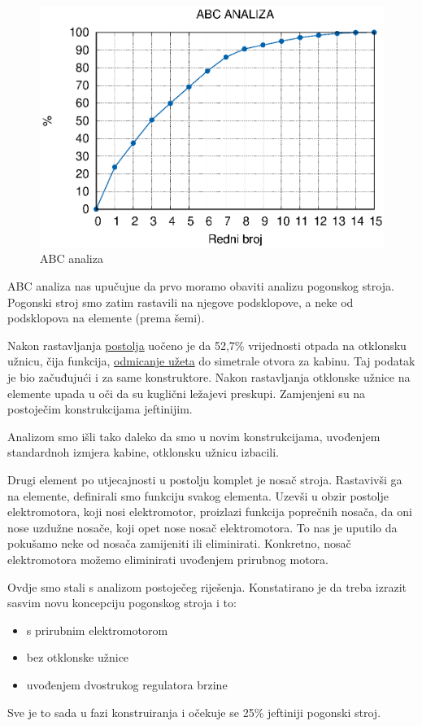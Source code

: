 \documentclass[a4paper,12pt]{article}
\numberwithin{figure}{section}
\begin{document}
\begin{figure}
  \centering
    \includegraphics[width=0.8\paperwidth]{abcAnaliza.eps}
    \caption{ABC analiza}
    \label{analiza}
\end{figure}
\FloatBarrier

ABC analiza nas upučujue da prvo moramo obaviti analizu pogonskog stroja. Pogonski stroj smo zatim rastavili na njegove podsklopove, a neke od podsklopova na elemente (prema šemi).\par
Nakon rastavljanja \underline{postolja} uočeno je da 52,7\% vrijednosti otpada na otklonsku užnicu, čija funkcija, \underline{odmicanje užeta} do simetrale otvora za kabinu. Taj podatak je bio začuđujući i za same konstruktore. Nakon rastavljanja otklonske užnice na elemente upada u oči da su kuglični ležajevi preskupi. Zamjenjeni su na postoječim konstrukcijama jeftinijim.\par
Analizom smo išli tako daleko da smo u novim konstrukcijama, uvođenjem standardnoh izmjera kabine, otklonsku užnicu izbacili.\par
Drugi element po utjecajnosti u postolju komplet je nosač stroja. Rastavivši ga na elemente, definirali smo funkciju svakog elementa. Uzevši u obzir postolje elektromotora, koji nosi elektromotor, proizlazi funkcija poprečnih nosača, da oni nose uzdužne nosače, koji opet nose nosač elektromotora. To nas je uputilo da pokušamo neke od nosača zamijeniti ili eliminirati. Konkretno, nosač elektromotora možemo eliminirati uvođenjem prirubnog motora.\par
Ovdje smo stali s analizom postoječeg riješenja. Konstatirano je da treba izrazit sasvim novu koncepciju pogonskog stroja i to:
\begin{itemize}
\item s prirubnim elektromotorom
\item bez otklonske užnice
\item uvođenjem dvostrukog regulatora brzine
\end{itemize}
Sve je to sada u fazi konstruiranja i očekuje se 25\% jeftiniji pogonski stroj.
\end{document}
